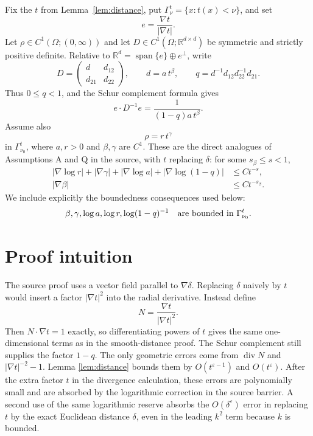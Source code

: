 \documentclass[11pt]{article}
\newcommand{\R}{\mathbb R}
\newcommand{\Om}{\Omega}
\newcommand{\diver}{\operatorname{div}}
\newcommand{\Grad}{\nabla}
\newcommand{\eps}{\varepsilon}
\begin{document}
Fix the \(t\) from Lemma~\ref{lem:distance}, put
\(\Gamma_\nu^t=\{x:t(x)<\nu\}\), and set
\[
e=\frac{\Grad t}{|\Grad t|}.
\]
Let \(\rho\in C^1(\Om;(0,\infty))\) and let
\(D\in C^1(\Om;\R^{d\times d})\) be symmetric and strictly positive
definite.  Relative to
\(\R^d=\operatorname{span}\{e\}\oplus e^\perp\), write
\[
D=\begin{pmatrix}d&d_{12}\\d_{21}&d_{22}\end{pmatrix},
\qquad
d=a\,t^\beta,\qquad
q=d^{-1}d_{12}d_{22}^{-1}d_{21}.
\]
Thus \(0\leq q<1\), and the Schur complement formula gives
\begin{equation}\label{eq:schur}
e\cdot D^{-1}e=\frac1{(1-q)a\,t^\beta}.
\end{equation}
Assume also
\[
\rho=r\,t^\gamma
\]
in \(\Gamma_{\nu_0}^t\), where \(a,r>0\) and
\(\beta,\gamma\) are \(C^1\).  These are the direct analogues of
Assumptions A and Q in the source, with \(t\) replacing \(\delta\):
for some \(s_\beta\leq s<1\),
\begin{equation}\label{eq:coefficient-bounds}
\begin{split}
|\Grad\log r|+|\Grad\gamma|+|\Grad\log a|
+|\Grad\log(1-q)|&\leq Ct^{-s},\\
|\Grad\beta|&\leq Ct^{-s_\beta}.
\end{split}
\end{equation}
We include explicitly the boundedness consequences used below:
\[
\beta,\gamma,\log a,\log r,\log(1-q)^{-1}
\quad\hbox{are bounded in }\Gamma_{\nu_0}^t.
\]

\section{Proof intuition}

The source proof uses a vector field parallel to \(\Grad\delta\).  Replacing
\(\delta\) naively by \(t\) would insert a factor \(|\Grad t|^2\) into the
radial derivative.  Instead define
\[
N=\frac{\Grad t}{|\Grad t|^2}.
\]
Then \(N\cdot\Grad t=1\) exactly, so differentiating powers of \(t\) gives
the same one-dimensional terms as in the smooth-distance proof.  The Schur
complement still supplies the factor \(1-q\).  The only geometric errors
come from \(\diver N\) and \(|\Grad t|^{-2}-1\).  Lemma
\ref{lem:distance} bounds them by \(O(t^{\eps-1})\) and \(O(t^\eps)\).
After the extra factor \(t\) in the divergence calculation, these errors
are polynomially small and are absorbed by the logarithmic correction in
the source barrier.  A second use of the same logarithmic reserve absorbs
the \(O(\delta^\eps)\) error in replacing \(t\) by the exact Euclidean
distance \(\delta\), even in the leading \(k^2\) term because \(k\) is
bounded.
\end{document}
